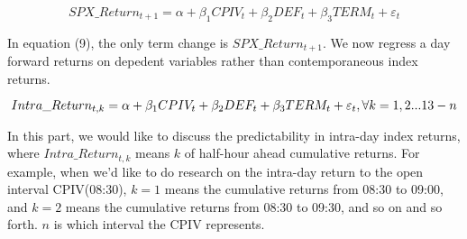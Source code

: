 \begin{equation} \label{eq:1dayahead}
SPX\_Return_{t+1} = \alpha + \beta _{1}CPIV_{t} + \beta _{2}DEF_{t} + \beta _{3}TERM_{t} + \varepsilon _{t}
\end{equation}

In equation (9), the only term change is $SPX\_Return_{t+1}$. We now regress a day forward returns on depedent variables rather than contemporaneous index returns. 

\begin{equation}
\small
Intra\_Return_{t, k} = \alpha + \beta _{1}CPIV_{t} + \beta _{2}DEF_{t} + \beta _{3}TERM_{t} + \varepsilon _{t},    
\forall k = 1, 2...13-n  
\end{equation}

In this part, we would like to discuss the predictability in intra-day index returns, where $Intra\_Return_{t, k}$ means $k$ of half-hour ahead cumulative returns. For example, when we'd like to do research on the intra-day return to the open interval CPIV(08:30), $k = 1$ means the cumulative returns from 08:30 to 09:00, and  $k = 2$ means the cumulative returns from 08:30 to 09:30, and so on and so forth. $n$ is which interval the CPIV represents. 





